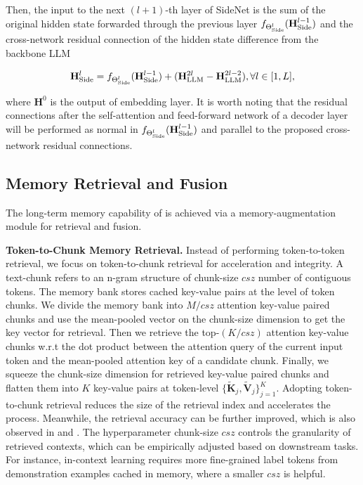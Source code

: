 Then, the input to the next $(l+1)$-th layer of SideNet is the sum of the original hidden state forwarded through the previous layer $f_{\Theta_{\textnormal{Side}}^l}(\mathbf{H}_\text{Side}^{l-1})$ and the cross-network residual connection of the hidden state difference from the backbone LLM

\begin{align}
\mathbf{H}^{l}_{\textnormal{Side}}=f_{\Theta^l_{\textnormal{Side}}}(\mathbf{H}_{\textnormal{Side}}^{l-1})+(\mathbf{H}_{\textnormal{LLM}}^{2l}-\mathbf{H}_{\textnormal{LLM}}^{2l-2}),\forall l\in [1,L],
\label{eq:residual}
\end{align}

 
where $\mathbf{H}^0$ is the output of embedding layer. It is worth noting that the residual connections after the self-attention and feed-forward network of a decoder layer~\cite{Vaswani2017AttentionIA} will be performed as normal in $f_{\Theta^l_{\textnormal{Side}}}(\mathbf{H}_{\textnormal{Side}}^{l-1})$ and parallel to the proposed cross-network residual connections. 

\subsection{Memory Retrieval and Fusion}
\label{ssec:mem_rf}
The long-term memory capability of \our{} is achieved via a memory-augmentation module for retrieval and fusion.

\textbf{Token-to-Chunk Memory Retrieval.} Instead of performing token-to-token retrieval, we focus on token-to-chunk retrieval for acceleration and integrity. A text-chunk refers to an n-gram structure of chunk-size $csz$ number of contiguous tokens. The memory bank stores cached key-value pairs at the level of token chunks. We divide the memory bank into $M/csz$ attention key-value paired chunks and use the mean-pooled vector on the chunk-size dimension to get the key vector for retrieval. Then we retrieve the top-$(K/csz)$ attention key-value chunks w.r.t the dot product between the attention query of the current input token and the mean-pooled attention key of a candidate chunk. Finally, we squeeze the chunk-size dimension for retrieved key-value paired chunks and flatten them into $K$ key-value pairs at token-level $\{\widetilde{\mathbf{K}}_{j},\widetilde{\mathbf{V}}_{j} \}_{j=1}^K$.
Adopting token-to-chunk retrieval reduces the size of the retrieval index and accelerates the process. Meanwhile, the retrieval accuracy can be further improved, which is also observed in \cite{n-gram-nnmt} and \cite{RETRO}. The hyperparameter chunk-size $csz$ controls the granularity of retrieved contexts, which can be empirically adjusted based on downstream tasks. For instance, in-context learning requires more fine-grained label tokens from demonstration examples cached in memory, where a smaller $csz$ is helpful.

